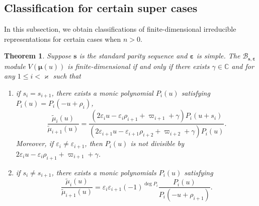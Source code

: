 \documentclass[11pt,reqno]{amsart}
\numberwithin{equation}{section}
\newtheorem{thm}{Theorem}[section]
\theoremstyle{definition}
\theoremstyle{remark}
\newcommand{\beq}{\begin{equation}}
\newcommand{\eeq}{\end{equation}}
\newcommand{\C}{\mathbb{C}}
\newcommand{\tl}{\tilde}
\newcommand{\lle}{\leqslant}
\newcommand{\BMN}{{\mathscr{B}_{\bm s,\bm \ve}}}
\newcommand{\ka}{\varkappa}
\newcommand{\ve}{\varepsilon}
\newcommand{\s}{{\bm s}}
\begin{document}
\subsection{Classification for certain super cases} In this subsection, we obtain classifications of finite-dimensional irreducible representations for certain cases when $n>0$.
\begin{thm}\label{thm:main-super-class}
Suppose  $\s$ is the standard parity sequence and $\bm\ve$ is simple. The $\BMN$ module $V(\bm\mu(u))$ is finite-dimensional if and only if there exists $\gamma\in\C$ and for any $1\lle i<\ka$ such that
\begin{enumerate}
    \item if $s_i=s_{i+1}$, there exists a monic polynomial $P_i(u)$ satisfying $P_i(u)=P_i(-u+\rho_i)$,
\beq\label{eq:gamma-thm}
\frac{\tl \mu_i(u)}{\tl \mu_{i+1}(u)}=\frac{(2\ve_i u-\ve_i\rho_{i+1}+\varpi_{i+1}+\gamma)P_i(u+s_i)}{(2\ve_{i+1} u-\ve_{i+1}\rho_{i+2}+\varpi_{i+2}+\gamma)P_i(u)}.
\eeq
Moreover, if $\ve_i\ne\ve_{i+1}$, then $P_i(u)$ is not divisible by $2\ve_i u-\ve_i\rho_{i+1}+\varpi_{i+1}+\gamma$.
\item if $s_i\ne s_{i+1}$, there exists a monic polynomials $P_i(u)$ satisfying
\[
\frac{\tl \mu_i(u)}{\tl \mu_{i+1}(u)}=\ve_i\ve_{i+1}(-1)^{\deg P_i}\frac{P_i(u)}{P_{i}(-u+\rho_{i+1})}.
\]
\end{enumerate}
\end{thm}
\end{document}
